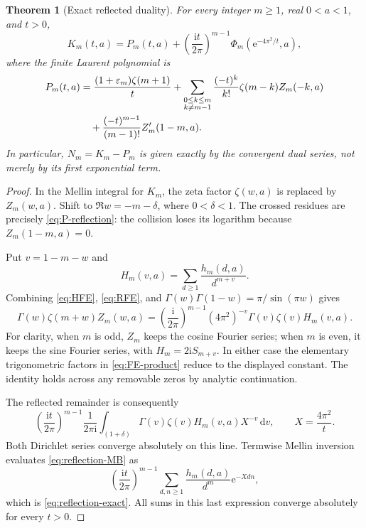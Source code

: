 \documentclass[11pt,a4paper]{article}
\numberwithin{equation}{section}
\newtheorem{theorem}{Theorem}[section]
\theoremstyle{definition}\newtheorem{definition}[theorem]{Definition}
\theoremstyle{remark}\newtheorem{remark}[theorem]{Remark}
\newcommand{\ii}{\mathrm i}\newcommand{\e}{\mathrm e}
\newcommand{\dd}{\,\mathrm d}\newcommand{\Li}{\operatorname{Li}}
\newcommand{\eps}{\varepsilon}\newcommand{\muh}{\widehat\mu}
\begin{document}
\begin{theorem}[Exact reflected duality]\label{thm:reflection}
For every integer $m\ge1$, real $0<a<1$, and $t>0$,
\begin{equation}
 K_m(t,a)=P_m(t,a)+\left(\frac{\ii t}{2\pi}\right)^{m-1}
                         \Phi_m(\e^{-4\pi^2/t},a),
 \label{eq:reflection-exact}
\end{equation}
where the finite Laurent polynomial is
\begin{align}
 P_m(t,a)&=\frac{(1+\eps_m)\zeta(m+1)}t
 +\sum_{\substack{0\le k\le m\\k\ne m-1}}
       \frac{(-t)^k}{k!}\zeta(m-k)Z_m(-k,a)\notag\\
 &\quad+\frac{(-t)^{m-1}}{(m-1)!}Z_m'(1-m,a).
 \label{eq:P-reflection}
\end{align}
In particular, $N_m=K_m-P_m$ is given exactly by the convergent dual
series, not merely by its first exponential term.
\end{theorem}
\begin{proof}
In the Mellin integral for $K_m$, the zeta factor $\zeta(w,a)$ is replaced
by $Z_m(w,a)$. Shift to $\Re w=-m-\delta$, where $0<\delta<1$.
The crossed residues are precisely \eqref{eq:P-reflection}: the
collision loses its logarithm because $Z_m(1-m,a)=0$.

Put $v=1-m-w$ and
\[
 H_m(v,a)=\sum_{d\ge1}\frac{h_m(d,a)}{d^{m+v}}.
\]
Combining \eqref{eq:HFE}, \eqref{eq:RFE}, and
$\Gamma(w)\Gamma(1-w)=\pi/\sin(\pi w)$ gives
\begin{equation}
 \Gamma(w)\zeta(m+w)Z_m(w,a)
 =\left(\frac{\ii}{2\pi}\right)^{m-1}(4\pi^2)^{-v}
              \Gamma(v)\zeta(v)H_m(v,a).
 \label{eq:FE-product}
\end{equation}
For clarity, when $m$ is odd, $Z_m$ keeps the cosine Fourier series;
when $m$ is even, it keeps the sine Fourier series, with
$H_m=2\ii S_{m+v}$. In either case the elementary trigonometric factors
in \eqref{eq:FE-product} reduce to the displayed constant. The identity
holds across any removable zeros by analytic continuation.

The reflected remainder is consequently
\begin{equation}
 \left(\frac{\ii t}{2\pi}\right)^{m-1}
 \frac1{2\pi\ii}\int_{(1+\delta)}
  \Gamma(v)\zeta(v)H_m(v,a)X^{-v}\dd v,
 \qquad X=\frac{4\pi^2}t.
 \label{eq:reflection-MB}
\end{equation}
Both Dirichlet series converge absolutely on this line. Termwise
Mellin inversion evaluates \eqref{eq:reflection-MB} as
\[
 \left(\frac{\ii t}{2\pi}\right)^{m-1}
 \sum_{d,n\ge1}\frac{h_m(d,a)}{d^m}\e^{-Xdn},
\]
which is \eqref{eq:reflection-exact}. All sums in this last expression
converge absolutely for every $t>0$.
\end{proof}
\end{document}
